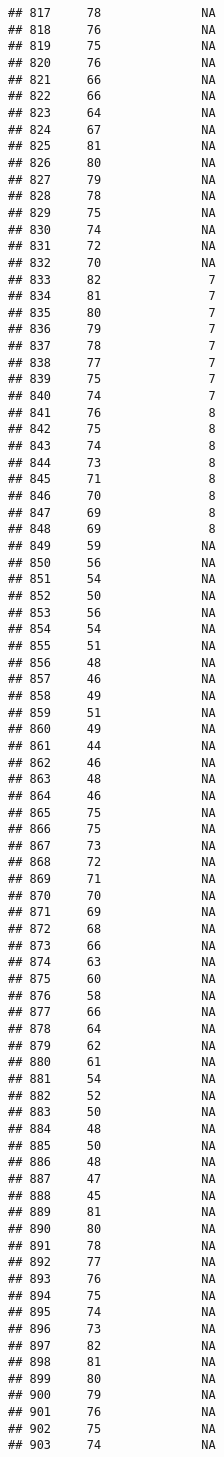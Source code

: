 \documentclass[]{article}
\begin{document}
\begin{verbatim}
## 817     78              NA
## 818     76              NA
## 819     75              NA
## 820     76              NA
## 821     66              NA
## 822     66              NA
## 823     64              NA
## 824     67              NA
## 825     81              NA
## 826     80              NA
## 827     79              NA
## 828     78              NA
## 829     75              NA
## 830     74              NA
## 831     72              NA
## 832     70              NA
## 833     82               7
## 834     81               7
## 835     80               7
## 836     79               7
## 837     78               7
## 838     77               7
## 839     75               7
## 840     74               7
## 841     76               8
## 842     75               8
## 843     74               8
## 844     73               8
## 845     71               8
## 846     70               8
## 847     69               8
## 848     69               8
## 849     59              NA
## 850     56              NA
## 851     54              NA
## 852     50              NA
## 853     56              NA
## 854     54              NA
## 855     51              NA
## 856     48              NA
## 857     46              NA
## 858     49              NA
## 859     51              NA
## 860     49              NA
## 861     44              NA
## 862     46              NA
## 863     48              NA
## 864     46              NA
## 865     75              NA
## 866     75              NA
## 867     73              NA
## 868     72              NA
## 869     71              NA
## 870     70              NA
## 871     69              NA
## 872     68              NA
## 873     66              NA
## 874     63              NA
## 875     60              NA
## 876     58              NA
## 877     66              NA
## 878     64              NA
## 879     62              NA
## 880     61              NA
## 881     54              NA
## 882     52              NA
## 883     50              NA
## 884     48              NA
## 885     50              NA
## 886     48              NA
## 887     47              NA
## 888     45              NA
## 889     81              NA
## 890     80              NA
## 891     78              NA
## 892     77              NA
## 893     76              NA
## 894     75              NA
## 895     74              NA
## 896     73              NA
## 897     82              NA
## 898     81              NA
## 899     80              NA
## 900     79              NA
## 901     76              NA
## 902     75              NA
## 903     74              NA

\end{verbatim}
\end{document}
